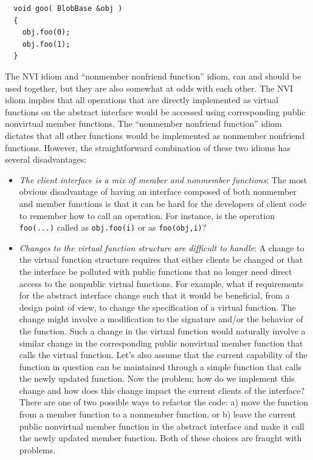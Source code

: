 \documentclass[pdf,ps2pdf,11pt]{SANDreport}
\begin{document}
{\small\begin{verbatim}
  void goo( BlobBase &obj )
  {
    obj.foo(0);
    obj.foo(1);
  }
\end{verbatim}}

The NVI idiom and ``nonmember nonfriend function'' idiom, can and should be
used together, but they are also somewhat at odds with each other.  The NVI
idiom implies that all operations that are directly implemented as virtual
functions on the abstract interface would be accessed using corresponding
public nonvirtual member functions.  The ``nonmember nonfriend function'' idiom
dictates that all other functions would be implemented as nonmember nonfriend
functions.  However, the straightforward combination of these two idioms has
several disadvantages:

\begin{itemize}

{}\item\textit{The client interface is a mix of member and nonmember
functions}: The most obvious disadvantage of having an interface composed of
both nonmember and member functions is that it can be hard for the developers
of client code to remember how to call an operation.  For instance, is the
operation {}\texttt{foo(...)} called as {}\texttt{obj.foo(i)} or as
{}\texttt{foo(obj,i)}?

{}\item\textit{Changes to the virtual function structure are difficult to
handle}: A change to the virtual function structure requires that either
clients be changed or that the interface be polluted with public functions
that no longer need direct access to the nonpublic virtual functions.  For
example, what if requirements for the abstract interface change such that it
would be beneficial, from a design point of view, to change the specification
of a virtual function.  The change might involve a modification to the
signature and/or the behavior of the function.  Such a change in the virtual
function would naturally involve a similar change in the corresponding public
nonvirtual member function that calls the virtual function.  Let's also assume
that the current capability of the function in question can be maintained
through a simple function that calls the newly updated function.  Now the
problem; how do we implement this change and how does this change impact the
current clients of the interface?  There are one of two possible ways to
refactor the code: a) move the function from a member function to a nonmember
function, or b) leave the current public nonvirtual member function in the
abstract interface and make it call the newly updated member function.  Both
of these choices are fraught with problems.

\end{itemize}
\end{document}
